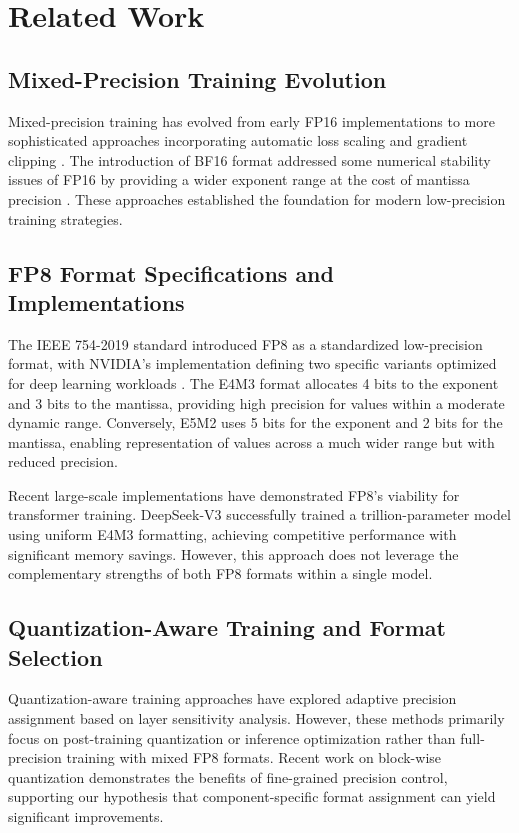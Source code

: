 \documentclass[conference]{IEEEtran}
\begin{document}
\section{Related Work}

\subsection{Mixed-Precision Training Evolution}

Mixed-precision training has evolved from early FP16 implementations \cite{narang2017mixed} to more sophisticated approaches incorporating automatic loss scaling and gradient clipping \cite{micikevicius2018mixed}. The introduction of BF16 format addressed some numerical stability issues of FP16 by providing a wider exponent range at the cost of mantissa precision \cite{kalamkar2019study}. These approaches established the foundation for modern low-precision training strategies.

\subsection{FP8 Format Specifications and Implementations}

The IEEE 754-2019 standard introduced FP8 as a standardized low-precision format, with NVIDIA's implementation defining two specific variants optimized for deep learning workloads \cite{micikevicius2022fp8formatsdeeplearning}. The E4M3 format allocates 4 bits to the exponent and 3 bits to the mantissa, providing high precision for values within a moderate dynamic range. Conversely, E5M2 uses 5 bits for the exponent and 2 bits for the mantissa, enabling representation of values across a much wider range but with reduced precision.

Recent large-scale implementations have demonstrated FP8's viability for transformer training. DeepSeek-V3 \cite{deepseekv3} successfully trained a trillion-parameter model using uniform E4M3 formatting, achieving competitive performance with significant memory savings. However, this approach does not leverage the complementary strengths of both FP8 formats within a single model.
\subsection{Quantization-Aware Training and Format Selection}

Quantization-aware training approaches \cite{jacob2018quantization} have explored adaptive precision assignment based on layer sensitivity analysis. However, these methods primarily focus on post-training quantization or inference optimization rather than full-precision training with mixed FP8 formats. Recent work on block-wise quantization \cite{dettmers2022gpt3} demonstrates the benefits of fine-grained precision control, supporting our hypothesis that component-specific format assignment can yield significant improvements.
\end{document}
